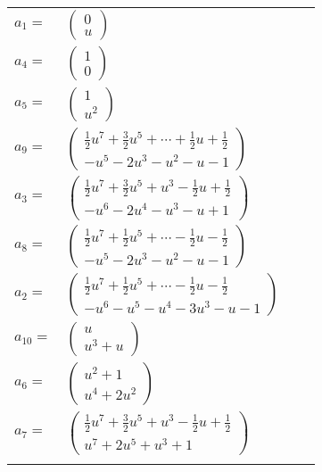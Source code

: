 \documentclass[1p]{elsarticle_modified}
\theoremstyle{definition}
\begin{document}
\begin{tabular}{m{7pt} m{180pt} m{7pt} m{180pt} }
\flushright $a_{1}=$&$\begin{pmatrix}0\\u\end{pmatrix}$ \\
\flushright $a_{4}=$&$\begin{pmatrix}1\\0\end{pmatrix}$ \\
\flushright $a_{5}=$&$\begin{pmatrix}1\\u^2\end{pmatrix}$ \\
\flushright $a_{9}=$&$\begin{pmatrix}\frac{1}{2} u^7+\frac{3}{2} u^5+\cdots+\frac{1}{2} u+\frac{1}{2}\\- u^5-2 u^3- u^2- u-1\end{pmatrix}$ \\
\flushright $a_{3}=$&$\begin{pmatrix}\frac{1}{2} u^7+\frac{3}{2} u^5+u^3-\frac{1}{2} u+\frac{1}{2}\\- u^6-2 u^4- u^3- u+1\end{pmatrix}$ \\
\flushright $a_{8}=$&$\begin{pmatrix}\frac{1}{2} u^7+\frac{1}{2} u^5+\cdots-\frac{1}{2} u-\frac{1}{2}\\- u^5-2 u^3- u^2- u-1\end{pmatrix}$ \\
\flushright $a_{2}=$&$\begin{pmatrix}\frac{1}{2} u^7+\frac{1}{2} u^5+\cdots-\frac{1}{2} u-\frac{1}{2}\\- u^6- u^5- u^4-3 u^3- u-1\end{pmatrix}$ \\
\flushright $a_{10}=$&$\begin{pmatrix}u\\u^3+u\end{pmatrix}$ \\
\flushright $a_{6}=$&$\begin{pmatrix}u^2+1\\u^4+2 u^2\end{pmatrix}$ \\
\flushright $a_{7}=$&$\begin{pmatrix}\frac{1}{2} u^7+\frac{3}{2} u^5+u^3-\frac{1}{2} u+\frac{1}{2}\\u^7+2 u^5+u^3+1\end{pmatrix}$\\&\end{tabular}
\end{document}
